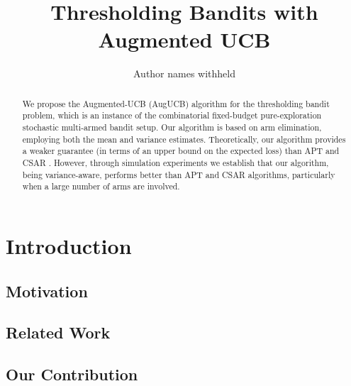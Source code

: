 \documentclass{article}
\title{Thresholding Bandits with Augmented UCB}
\author{Author names withheld}
\begin{document}
\maketitle

\begin{abstract}
We propose the  Augmented-UCB (AugUCB) algorithm for the thresholding bandit problem, which is an instance of the combinatorial fixed-budget pure-exploration stochastic multi-armed bandit setup. Our algorithm is 
based on arm elimination, employing both the mean and variance estimates.  
Theoretically, our algorithm provides a weaker guarantee (in terms of an upper bound on the expected loss) than APT \cite{locatelli2016optimal} and CSAR \cite{chen2014combinatorial}.
However, through simulation experiments we establish that our algorithm, being variance-aware, performs  better than APT and CSAR algorithms, particularly when a large number of arms are involved. 

\end{abstract}


\section{Introduction}
\label{intro}


\subsection{Motivation}
\label{motivation}


\subsection{Related Work}
\label{prevRes}


\subsection{Our Contribution}
\label{contribution}

\end{document}
